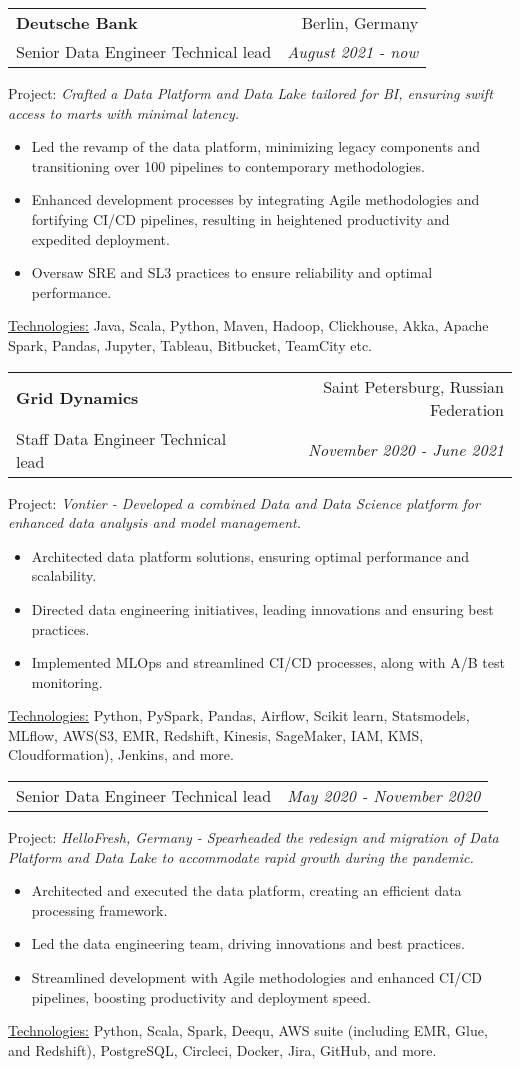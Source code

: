 \documentclass[letterpaper,11pt]{article}
\makeatletter
\newcommand{\sepsection}{\vspace{25pt}}
\newcommand{\resumeItem}[1]{%
    \item\small{
        #1
    }
}
\newcommand{\resumeSubheading}[4]{
    \vspace{8pt}\item%
    \begin{tabular*}{0.97\textwidth}[t]{l@{\extracolsep{\fill}}r}
        \textbf{#1}     & #2                 \\
        \textnormal{#3} & \textit{\small #4} \\
    \end{tabular*}\vspace{-5pt}
}
\newcommand{\resumeSubSubheading}[2]{
    \vspace{5pt}
    \begin{tabular*}{0.97\textwidth}{l@{\extracolsep{\fill}}r}
        \textnormal{#1} & \textit{\small #2} \\
    \end{tabular*}\vspace{-5pt}
}
\newcommand{\resumeProjectDescription}[2]{\vspace{5pt} \textnormal{#1:} \textit{\small#2}}
\newcommand{\resumeItemListStart}{\begin{itemize}}
\newcommand{\resumeItemListEnd}{\end{itemize}\vspace{-5pt}}
\newcommand{\resumeTech}[2]{
\underline{#1:} #2
}
\makeatother
\begin{document}
\resumeSubheading
{Deutsche Bank \href{www.db.com/}{\color{urlcolor}\faicon{link}}}{Berlin, Germany}
{Senior Data Engineer \textbar Technical lead}{August 2021 - now}

\resumeProjectDescription{Project}{Crafted a Data Platform and Data Lake tailored for BI, ensuring swift access to marts with minimal latency.}

\resumeItemListStart
\resumeItem{Led the revamp of the data platform, minimizing legacy components and transitioning over 100 pipelines to contemporary methodologies.}
\resumeItem{Enhanced development processes by integrating Agile methodologies and fortifying CI/CD pipelines, resulting in heightened productivity and expedited deployment.}
\resumeItem{Oversaw SRE and SL3 practices to ensure reliability and optimal performance.}
\resumeItemListEnd
\resumeTech{Technologies}{Java, Scala, Python, Maven, Hadoop, Clickhouse, Akka, Apache Spark, Pandas, Jupyter, Tableau, Bitbucket, TeamCity etc.}\\

\sepsection

\resumeSubheading
{Grid Dynamics \href{https://www.griddynamics.com/}{\color{urlcolor}\faicon{link}}}{Saint Petersburg, Russian Federation}
{Staff Data Engineer \textbar Technical lead}{November 2020 - June 2021}

\resumeProjectDescription{Project}{Vontier - Developed a combined Data and Data Science platform for enhanced data analysis and model management.}
\resumeItemListStart
\resumeItem{Architected data platform solutions, ensuring optimal performance and scalability.}
\resumeItem{Directed data engineering initiatives, leading innovations and ensuring best practices.}
\resumeItem{Implemented MLOps and streamlined CI/CD processes, along with A/B test monitoring.}
\resumeItemListEnd
\resumeTech{Technologies}{Python, PySpark, Pandas, Airflow, Scikit learn, Statsmodels, MLflow, AWS(S3, EMR, Redshift, Kinesis, SageMaker, IAM, KMS, Cloudformation), Jenkins, and more.}

\resumeSubSubheading
{Senior Data Engineer \textbar Technical lead}{May 2020 - November 2020}

\resumeProjectDescription{Project}{HelloFresh, Germany - Spearheaded the redesign and migration of Data Platform and Data Lake to accommodate rapid growth during the pandemic.}

\resumeItemListStart
\resumeItem{Architected and executed the data platform, creating an efficient data processing framework.}
\resumeItem{Led the data engineering team, driving innovations and best practices.}
\resumeItem{Streamlined development with Agile methodologies and enhanced CI/CD pipelines, boosting productivity and deployment speed.}
\resumeItemListEnd
\resumeTech{Technologies}{Python, Scala, Spark, Deequ, AWS suite (including EMR, Glue, and Redshift), PostgreSQL, Circleci, Docker, Jira, GitHub, and more.}
\end{document}
